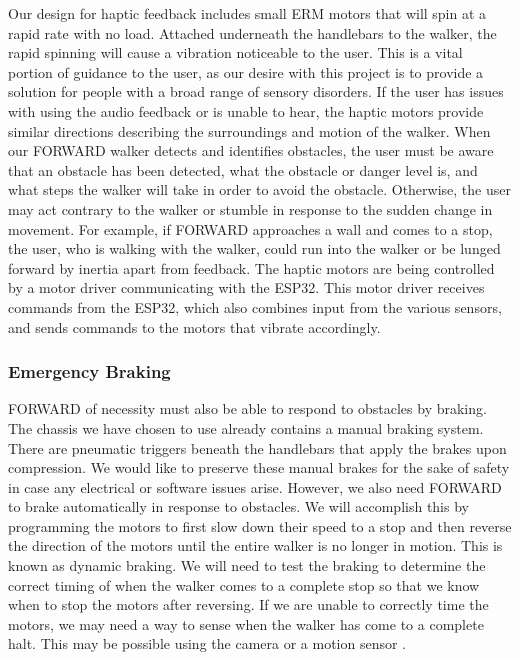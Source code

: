 \noindent Our design for haptic feedback includes small ERM motors that will spin at a rapid rate with no load. Attached underneath the handlebars to the walker, the rapid spinning will cause a vibration noticeable to the user. This is a vital portion of guidance to the user, as our desire with this project is to provide a solution for people with a broad range of sensory disorders. If the user has issues with using the audio feedback or is unable to hear, the haptic motors provide similar directions describing the surroundings and motion of the walker. When our FORWARD walker detects and identifies obstacles, the user must be aware that an obstacle has been detected, what the obstacle or danger level is, and what steps the walker will take in order to avoid the obstacle. Otherwise, the user may act contrary to the walker or stumble in response to the sudden change in movement. For example, if FORWARD approaches a wall and comes to a stop, the user, who is walking with the walker, could run into the walker or be lunged forward by inertia apart from feedback. The haptic motors are being controlled by a motor driver communicating with the ESP32. This motor driver receives commands from the ESP32, which also combines input from the various sensors, and sends commands to the motors that vibrate accordingly.\\

\subsubsection{Emergency Braking}
\noindent FORWARD of necessity must also be able to respond to obstacles by braking. The chassis we have chosen to use already contains a manual braking system. There are pneumatic triggers beneath the handlebars that apply the brakes upon compression. We would like to preserve these manual brakes for the sake of safety in case any electrical or software issues arise. However, we also need FORWARD to brake automatically in response to obstacles. We will accomplish this by programming the motors to first slow down their speed to a stop and then reverse the direction of the motors until the entire walker is no longer in motion. This is known as dynamic braking\cite{electricaleasy2014}. We will need to test the braking to determine the correct timing of when the walker comes to a complete stop so that we know when to stop the motors after reversing. If we are unable to correctly time the motors, we may need a way to sense when the walker has come to a complete halt. This may be possible using the camera or a motion sensor \cite{bayalarm2024}.\\

